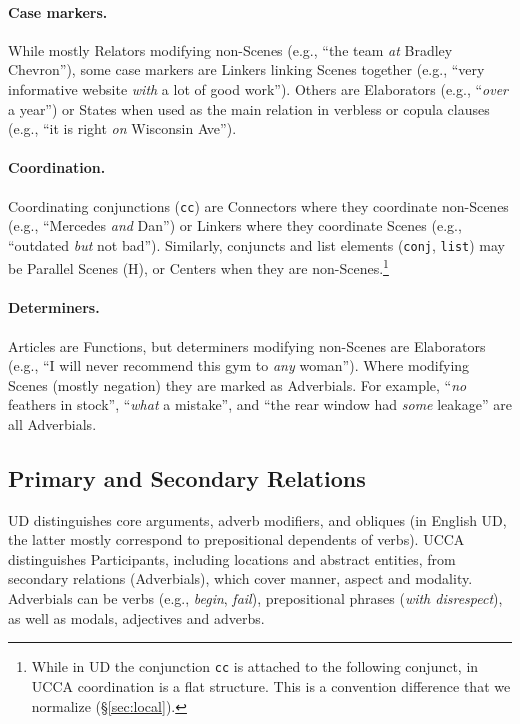\documentclass[11pt,a4paper,table]{article}
\begin{document}
\paragraph{Case markers.}
      While mostly Relators
      modifying non-Scenes (e.g., ``the team \textit{at} Bradley Chevron''),
      some case markers are Linkers linking Scenes together 
      (e.g., ``very informative website \textit{with} a lot of good work'').
      Others are Elaborators (e.g., ``\textit{over} a year'') or States
      when used as the main relation in verbless or copula clauses
      (e.g., ``it is right \textit{on} Wisconsin Ave'').
    
\paragraph{Coordination.}
      Coordinating conjunctions (\texttt{cc}) are Connectors where they coordinate non-Scenes
      (e.g., ``Mercedes \textit{and} Dan'')
      or Linkers where they coordinate Scenes (e.g., ``outdated \textit{but} not bad'').
      Similarly, conjuncts and list elements (\texttt{conj}, \texttt{list}) may be Parallel Scenes (H),
      or Centers when they are non-Scenes.\footnote{While in UD 
      the conjunction \texttt{cc} is attached to the following conjunct,
      in UCCA coordination is a flat structure.
      This is a convention difference that we normalize (\S\ref{sec:local}).}

\paragraph{Determiners.}
      Articles are Functions,
      but determiners modifying non-Scenes are Elaborators
      (e.g., ``I will never recommend this gym to \textit{any} woman'').
      Where modifying Scenes (mostly negation)
      they are marked as Adverbials. For example, ``\textit{no} feathers in stock'', ``\textit{what} a mistake'',
      and ``the rear window had \textit{some} leakage'' are all Adverbials.



\subsection{Primary and Secondary Relations}\label{sec:arguments}

UD distinguishes core arguments, adverb modifiers,
and obliques (in English UD, the latter mostly correspond to prepositional dependents of verbs).
UCCA distinguishes Participants, including locations and abstract entities,
from secondary relations (Adverbials), 
which cover manner, aspect and modality.
Adverbials can be verbs (e.g., \textit{begin}, \textit{fail}),
prepositional phrases (\textit{with disrespect}),
as well as modals, adjectives and adverbs.
\end{document}
